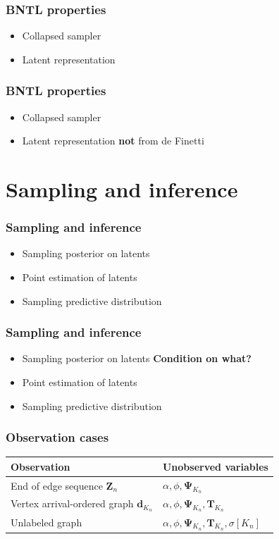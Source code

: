 \documentclass[final,hyperref={pdfpagelabels=false},noamsthm]{beamer}
\newcommand{\ee}{Z} %
\newcommand{\bfee}{\mathbf{\ee}}
\newcommand{\bfT}{\mathbf{T}}
\newcommand{\bfPsi}{\boldsymbol{\Psi}}
\newcommand{\bfd}{\mathbf{d}}
\begin{document}
\begin{frame}
	\frametitle{BNTL properties}
	\begin{itemize}
		\item Collapsed sampler
		\item Latent representation
	\end{itemize}
\end{frame}

\begin{frame}
	\frametitle{BNTL properties}
	\begin{itemize}
		\item Collapsed sampler
		\item Latent representation \textbf{not} from de Finetti
	\end{itemize}
\end{frame}


\section{Sampling and inference}
\begin{frame}
	\frametitle{Sampling and inference}
	\begin{itemize}
		\item Sampling posterior on latents
		\item Point estimation of latents
		\item Sampling predictive distribution
	\end{itemize}
\end{frame}

\begin{frame}
	\frametitle{Sampling and inference}
	\begin{itemize}
		\item Sampling posterior on latents \textbf{Condition on what?}
		\item Point estimation of latents 
		\item Sampling predictive distribution
	\end{itemize}
\end{frame}

\begin{frame}
	\frametitle{Observation cases}
	\begin{center}
		\begin{tabular}{ll}
			\textbf{Observation} & \textbf{Unobserved variables} \\
			\hline
			End of edge sequence $\bfee_n$ & $\alpha,\phi,\bfPsi_{K_n}$ \\
			Vertex arrival-ordered graph $\bfd_{K_n}$ & $\alpha,\phi,\bfPsi_{K_n}, \bfT_{K_n}$ \\
			Unlabeled graph & $\alpha,\phi,\bfPsi_{K_n},\bfT_{K_n},\sigma [K_n]$
		\end{tabular}
	\end{center}
\end{frame}
\end{document}
